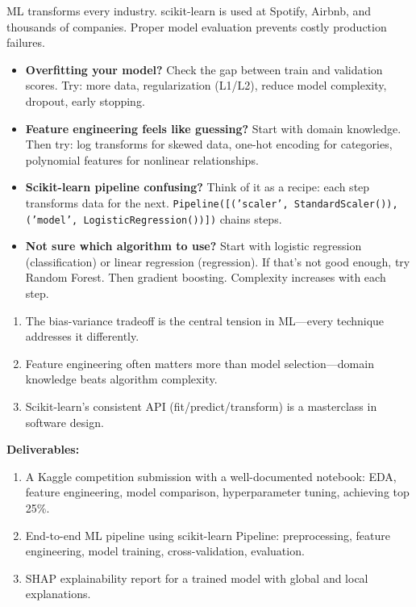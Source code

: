\documentclass[11pt, a4paper, oneside]{report}
\begin{document}
\begin{realworldbox}
ML transforms every industry. scikit-learn is used at Spotify, Airbnb, and thousands of companies. Proper model evaluation prevents costly production failures.
\end{realworldbox}


\begin{stuckbox}
\begin{itemize}[leftmargin=*]
\item \textbf{Overfitting your model?} Check the gap between train and validation scores. Try: more data, regularization (L1/L2), reduce model complexity, dropout, early stopping.
\item \textbf{Feature engineering feels like guessing?} Start with domain knowledge. Then try: log transforms for skewed data, one-hot encoding for categories, polynomial features for nonlinear relationships.
\item \textbf{Scikit-learn pipeline confusing?} Think of it as a recipe: each step transforms data for the next. \texttt{Pipeline([('scaler', StandardScaler()), ('model', LogisticRegression())])} chains steps.
\item \textbf{Not sure which algorithm to use?} Start with logistic regression (classification) or linear regression (regression). If that's not good enough, try Random Forest. Then gradient boosting. Complexity increases with each step.
\end{itemize}
\end{stuckbox}


\begin{takeawaybox}
\begin{enumerate}[leftmargin=*]
\item The bias-variance tradeoff is the central tension in ML---every technique addresses it differently.
\item Feature engineering often matters more than model selection---domain knowledge beats algorithm complexity.
\item Scikit-learn's consistent API (fit/predict/transform) is a masterclass in software design.
\end{enumerate}
\end{takeawaybox}

\begin{milestonebox}
\textbf{Deliverables:}
\begin{enumerate}[leftmargin=*]
\item A Kaggle competition submission with a well-documented notebook: EDA, feature engineering, model comparison, hyperparameter tuning, achieving top 25\%.
\item End-to-end ML pipeline using scikit-learn Pipeline: preprocessing, feature engineering, model training, cross-validation, evaluation.
\item SHAP explainability report for a trained model with global and local explanations.
\end{enumerate}
\end{milestonebox}
\end{document}
